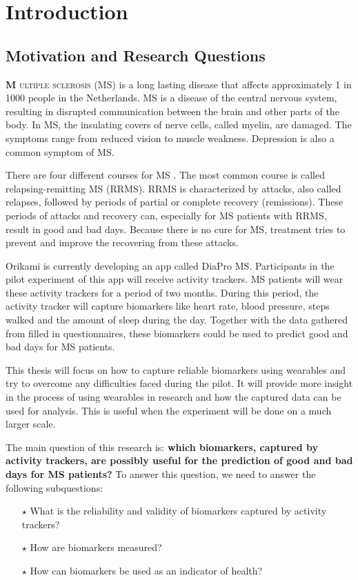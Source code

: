 \chapter{Introduction}\label{introduction}

\section{Motivation and Research Questions}
\lettrine[lhang = 0.4, findent=-60pt, lines=7]{\textbf{
		\initfamily \fontsize{40mm}{40mm} \selectfont M
		\normalfont}}{ultiple sclerosis (MS)}
 is a long lasting disease that affects approximately 1 in 1000 people in the Netherlands.
MS is a disease of the central nervous system, resulting in disrupted communication between the brain and other parts of the body.
In MS, the insulating covers of nerve cells, called myelin, are damaged.  
The symptoms range from reduced vision to muscle weakness. 
Depression is also a common symptom of MS.

There are four different courses for MS \cite{lublin2014defining}.
The most common course is called relapsing-remitting MS (RRMS).
RRMS is characterized by attacks, also called relapses, followed by periods of partial or complete recovery (remissions).
These periods of attacks and recovery can, especially for MS patients with RRMS, result in good and bad days.
Because there is no cure for MS, treatment tries to prevent and improve the recovering from these attacks.

Orikami is currently developing an app called DiaPro MS. 
Participants in the pilot experiment of this app will receive activity trackers. 
MS patients will wear these activity trackers for a period of two months.
During this period, the activity tracker will capture biomarkers like heart rate, blood pressure, steps walked and the amount of sleep during the day.
Together with the data gathered from filled in questionnaires, these biomarkers could be used to predict good and bad days for MS patients.

This thesis will focus on how to capture reliable biomarkers using wearables and try to overcome any difficulties faced during the pilot. 
It will provide more insight in the process of using wearables in research and how the captured data can be used for analysis.
This is useful when the experiment will be done on a much larger scale. 

The main question of this research is: \textbf{which biomarkers, captured by activity trackers, are possibly useful for the prediction of good and bad days for MS patients? }
To answer this question, we need to answer the following subquestions:
%
\begin{itemize}
	\item[$\star$] What is the reliability and validity of biomarkers captured by activity trackers?
	
	\item[$\star$] How are biomarkers measured?
	
	\item[$\star$] How can biomarkers be used as an indicator of health?
\end{itemize}
%

